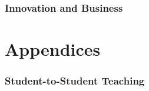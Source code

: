 \section{Innovation and Business}





\clearpage

\part{Appendices}
\appendix
{}%
\captionsetup{list=no}%

\newpage

\newpage
%

\clearpage
\section{Student-to-Student Teaching}
\newpage

\newpage

\newpage

\newpage

% 
 